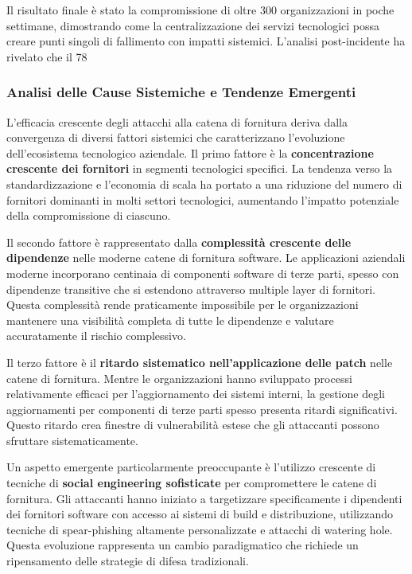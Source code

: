 {Il risultato finale è stato la compromissione di oltre 300 organizzazioni in poche settimane, dimostrando come la centralizzazione dei servizi tecnologici possa creare punti singoli di fallimento con impatti sistemici. L'analisi post-incidente ha rivelato che il 78%

\subsubsection{Analisi delle Cause Sistemiche e Tendenze Emergenti}

L'efficacia crescente degli attacchi alla catena di fornitura deriva dalla convergenza di diversi fattori sistemici che caratterizzano l'evoluzione dell'ecosistema tecnologico aziendale. Il primo fattore è la \textbf{concentrazione crescente dei fornitori} in segmenti tecnologici specifici. La tendenza verso la standardizzazione e l'economia di scala ha portato a una riduzione del numero di fornitori dominanti in molti settori tecnologici, aumentando l'impatto potenziale della compromissione di ciascuno.

Il secondo fattore è rappresentato dalla \textbf{complessità crescente delle dipendenze} nelle moderne catene di fornitura software. Le applicazioni aziendali moderne incorporano centinaia di componenti software di terze parti, spesso con dipendenze transitive che si estendono attraverso multiple layer di fornitori. Questa complessità rende praticamente impossibile per le organizzazioni mantenere una visibilità completa di tutte le dipendenze e valutare accuratamente il rischio complessivo.

Il terzo fattore è il \textbf{ritardo sistematico nell'applicazione delle patch} nelle catene di fornitura. Mentre le organizzazioni hanno sviluppato processi relativamente efficaci per l'aggiornamento dei sistemi interni, la gestione degli aggiornamenti per componenti di terze parti spesso presenta ritardi significativi. Questo ritardo crea finestre di vulnerabilità estese che gli attaccanti possono sfruttare sistematicamente.

Un aspetto emergente particolarmente preoccupante è l'utilizzo crescente di tecniche di \textbf{social engineering sofisticate} per compromettere le catene di fornitura. Gli attaccanti hanno iniziato a targetizzare specificamente i dipendenti dei fornitori software con accesso ai sistemi di build e distribuzione, utilizzando tecniche di spear-phishing altamente personalizzate e attacchi di watering hole. Questa evoluzione rappresenta un cambio paradigmatico che richiede un ripensamento delle strategie di difesa tradizionali.

}

